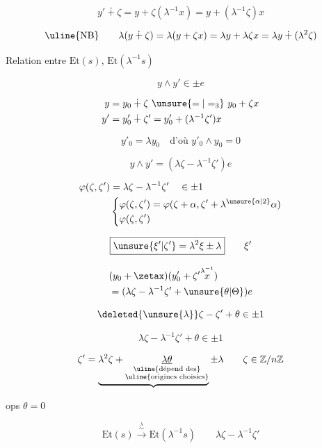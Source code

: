 \[
y'\dotplus\zeta=y+\zeta(\lambda^{-1}x)=y+(\lambda^{-1}\zeta)x
\]

\[
\text{\uline{NB}}\qquad\lambda(y\dotplus\zeta)=\lambda(y+\zeta x)=\lambda y+\lambda\zeta x=\lambda y\dotplus(\lambda^2\zeta)
\]

Relation  entre $\mathrm{Et}(s)$, $\mathrm{Et}(\lambda^{-1}s)$

\[
y\wedge y'\in\pm e
\]

\[
\begin{aligned}
y&=y_0\dotplus\zeta\ \unsure{=|=_{3}}\ y_0+\zeta x\\
y'&=y'_0\dotplus\zeta'=y'_0+(\lambda^{-1}\zeta')x
\end{aligned}
\]

\[
y'_0=\lambda y_0\quad\text{d'où }y'_0\wedge y_0=0
\]

\[
y\wedge y'=(\lambda\zeta-\lambda^{-1}\zeta')e
\]

\[
\begin{aligned}
\varphi(\zeta,\zeta')&=\lambda\zeta-\lambda^{-1}\zeta'\quad\in\pm1\\
&\left\{\begin{aligned}
\varphi(\zeta,\zeta')&=\varphi(\zeta+\alpha,\zeta'+\lambda^{\unsure{\alpha|2}}\alpha)\\
\varphi(\zeta,\zeta')&
\end{aligned}\right.
\end{aligned}
\]

\[
\boxed{\unsure{\xi'|\zeta'}=\lambda^2\xi\pm\lambda}\qquad\xi'
\]


\[
\begin{aligned}
&(y_0+\zetax)(y'_0+\zeta'\overset{\lambda^{-1}}{x})\\
&=(\lambda\zeta-\lambda^{-1}\zeta'+\unsure{\theta|\Theta})e
\end{aligned}
\]

\[
\deleted{\unsure{\lambda}}\zeta-\zeta'+\theta\in\pm1
\]

\[
\boxed{\lambda\zeta-\lambda^{-1}\zeta'+\theta\in\pm1}
\]

\[
\zeta'=\underbrace{\lambda^2\zeta+\underset{\substack{\text{\uline{dépend des}}\\\text{\uline{origines choisies}}}}{\underline{\lambda\theta}}}\pm\lambda
\qquad\zeta\in\mathbb Z/n\mathbb Z
\]

ops $\theta=0$

\[
\boxed{\mathrm{Et}(s)\xrightarrow{\overset{\lambda}{\sim}}\mathrm{Et}(\lambda^{-1}s)}
\qquad\lambda\zeta-\lambda^{-1}\zeta'
\]

